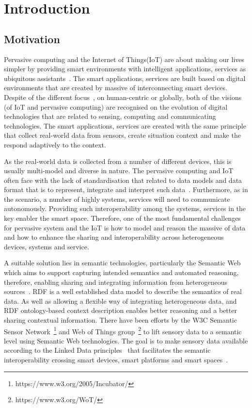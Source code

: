\chapter{Introduction}
\label{ch:introduction}
\section{Motivation}

Pervasive computing and the Internet of Things(IoT) are about making our lives simpler by providing smart environments with intelligent applications, services as ubiquitous assistants~\citep{Weiser:99}. 
The smart applications, services are built based on digital environments that are created by massive of interconnecting smart devices.
Despite of the different focus~\citep{Ebling:2017}, on human-centric or globally, both of the visions (of IoT and pervasive computing) are recognised on the evolution of digital technologies that are related to sensing, computing and communicating technologies. 
The smart applications, services are created with the same principle that collect real-world data from sensors, create situation context and make the respond adaptively to the context.

As the real-world data is collected from a number of different devices, this is usually multi-model and diverse in nature.
The pervasive computing and IoT often face with the lack of standardisation that related to data models and data format that is to represent, integrate and interpret such data~\citep{Miorandi:2012}. 
Furthermore, as in the scenario, a number of highly systems, services will need to communicate autonomously.
Providing such interoperability among the systems, services in the key enabler the smart space. 
Therefore, one of the most fundamental challenges for pervasive system and the IoT is how to model and reason the massive of data and how to enhance the sharing and interoperability across heterogeneous devices, systems and service.

A suitable solution lies in semantic technologies, particularly the Semantic Web which aims to support capturing intended semantics and automated reasoning, therefore, enabling sharing and integrating information from heterogeneous sources~\citep{Barnaghi:2012}. 
RDF is a well established data model to describe the semantics of real data.
As well as allowing a flexible way of integrating heterogeneous data, and RDF ontology-based context description enables better reasoning and a better sharing contextual information.
There have been efforts  by the W3C Semantic Sensor Network~\footnote{https://www.w3.org/2005/Incubator/} and Web of Things group~\footnote{https://www.w3.org/WoT/} to lift sensory data to a semantic level using Semantic Web technologies. 
The goal is to make sensory data available according to the Linked Data principles~\citep{Bizer:2011} that facilitates the semantic interoperability crossing smart devices, smart platforms and smart spaces~\citep{IERC:2013}. 

